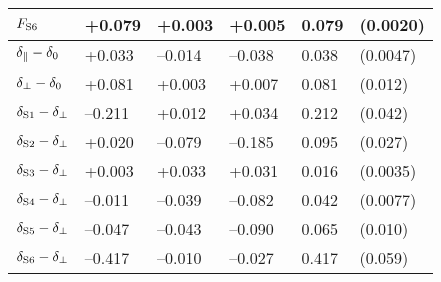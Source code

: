 \begin{table}[htbp]
\begin{tabular}{llllll}
    $\FS[6]$            &  +0.079    &  +0.003          &  +0.005          & 0.079  &  (0.0020)                    \\
    \hline
    $\delpar-\delzero$  &  +0.033    & --0.014          & --0.038          & 0.038  &  (0.0047)                    \\
    $\delperp-\delzero$ &  +0.081    &  +0.003          &  +0.007          & 0.081  &  (0.012)                     \\
    $\delS[1]-\delperp$ & --0.211    &  +0.012          &  +0.034          & 0.212  &  (0.042)                     \\
    $\delS[2]-\delperp$ &  +0.020    & --0.079          & --0.185          & 0.095  &  (0.027)                     \\
    $\delS[3]-\delperp$ &  +0.003    &  +0.033          &  +0.031          & 0.016  &  (0.0035)                    \\
    $\delS[4]-\delperp$ & --0.011    & --0.039          & --0.082          & 0.042  &  (0.0077)                    \\
    $\delS[5]-\delperp$ & --0.047    & --0.043          & --0.090          & 0.065  &  (0.010)                     \\
    $\delS[6]-\delperp$ & --0.417    & --0.010          & --0.027          & 0.417  &  (0.059)                     \\
    \hline
  \end{tabular}
\end{table}

